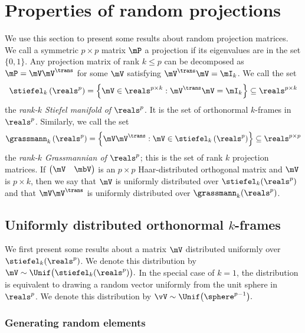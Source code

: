 
\chapter{Properties of random projections}\label{A:projections}

We use this section to present some results about random projection
matrices.  We call a symmetric $p \times p$ matrix $\mP$ a projection 
if its eigenvalues are in the set $\{ 0, 1 \}$.  Any projection matrix of rank
$k \leq p$ can be decomposed as $\mP = \mV \mV^\trans$ for some $\mV$
satisfying $\mV^\trans \mV = \mI_k$.  We call the set 
\[
    \stiefel_{k}\left( \reals^p \right)
        =
        \left\{
            \mV \in \reals^{p \times k}
            :
            \mV^\trans \mV = \mI_k
        \right\}
        \subseteq
        \reals^{p \times k}
\]
the \emph{rank-$k$ Stiefel manifold of $\reals^p$}.  It is the set
of orthonormal $k$-frames in $\reals^p$.  Similarly, we call 
the set
\[
    \grassmann_k\left( \reals^p \right)
        =
        \left\{
            \mV \mV^\trans
            :
            \mV \in \stiefel_k \left( \reals^p \right)
        \right\}
        \subseteq
        \reals^{p \times p}
\]
the \emph{rank-$k$ Grassmannian of $\reals^p$}; this is the set of
rank $k$ projection matrices.  If
\(
    \left(
    \begin{matrix}
        \mV & \mbV
    \end{matrix}
    \right)
\)
is an $p \times p$ Haar-distributed orthogonal matrix and $\mV$ is
$p \times k$, then we say that $\mV$ is uniformly distributed
over $\stiefel_k( \reals^p )$ and that $\mV \mV^\trans$ is uniformly
distributed over $\grassmann_k(\reals^p)$.


\section{Uniformly distributed orthonormal $k$-frames}

We first present some results about a matrix $\mV$ distributed uniformly
over $\stiefel_k(\reals^p)$.  We denote this distribution by
\(
    \mV 
        \sim
            \Unif \big(
                \stiefel_k(\reals^p)
            \big).
\)
In the special case of $k = 1$, the distribution is equivalent to drawing
a random vector uniformly from the unit sphere in $\reals^p$.  We denote 
this distribution by
\(
    \vV
        \sim
            \Unif \big(
                \sphere^{p-1}
            \big).
\)


\subsection{Generating random elements}

